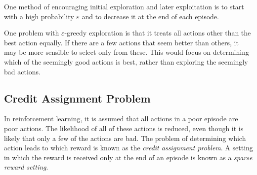 One method of encouraging initial exploration and later exploitation is to start with a high probability \( \varepsilon \) and to decrease it at the end of each episode.

One problem with \( \varepsilon \)-greedy exploration is that it treats all actions other than the best action equally.
If there are a few actions that seem better than others, it may be more sensible to select only from these.
This would focus on determining which of the seemingly good actions is best, rather than exploring the seemingly bad actions.

\subsection{Credit Assignment Problem}

In reinforcement learning, it is assumed that all actions in a poor episode are poor actions.
The likelihood of all of these actions is reduced, even though it is likely that only a few of the actions are bad.
The problem of determining which action leads to which reward is known as the \emph{credit assignment problem}.
A setting in which the reward is received only at the end of an episode is known as a \emph{sparse reward setting}.
